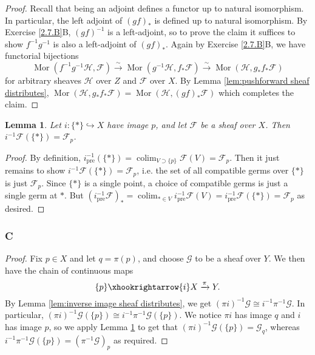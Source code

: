 \documentclass{article}
\newcommand{\fF}{\mathscr{F}}
\newcommand{\fG}{\mathscr{G}}
\newcommand{\fH}{\mathscr{H}}
\DeclareMathOperator{\pre}{\mathrm{pre}}
\DeclareMathOperator{\colim}{\mathrm{colim}}
\DeclareMathOperator{\Mor}{\mathrm{Mor}}
\newtheorem{lemma}[theorem]{Lemma}
\begin{document}
    \begin{proof}
        Recall that being an adjoint defines a functor up to natural isomorphism. In particular, the left adjoint of $(gf)_*$ is defined up to natural isomorphism. By Exercise \ref{2.7.B}B, $(gf)^{-1}$ is a left-adjoint, so to prove the claim it suffices to show $f^{-1}g^{-1}$ is also a left-adjoint of $(gf)_*$. Again by Exercise \ref{2.7.B}B, we have functorial bijections
        \[
        \Mor(f^{-1}g^{-1}\fH, \fF) \xrightarrow{\sim} \Mor(g^{-1} \fH, f_* \fF) \xrightarrow{\sim } \Mor(\fH, g_* f_* \fF)
        \]
        for arbitrary sheaves $\fH$ over $Z$ and $\fF$ over $X$. By Lemma \ref{lem:pushforward sheaf distributes}, $\Mor(\fH,g_*f_*\fF)= \Mor(\fH, (gf)_* \fF)$ which completes the claim.
    \end{proof}
    \begin{lemma}\label{lem:stalk as inverse image sheaf}
        Let $i:\{*\}\hookrightarrow X$ have image $p$, and let $\fF$ be a sheaf over $X$. Then $i^{-1} \fF(\{*\})=\fF_p$.
    \end{lemma}
    \begin{proof}
        By definition, $i^{-1}_{\pre}(\{*\})=\colim_{V\supset \{p\}} \fF(V) = \fF_p$. Then it just remains to show $i^{-1} \fF(\{*\}) = \fF_p$, i.e. the set of all compatible germs over $\{*\}$ is just $\fF_p$. Since $\{*\}$ is a single point, a choice of compatible germs is just a single germ at $*$. But $(i^{-1}_{\pre} \fF)_*=\colim_{*\in V} i^{-1}_{\pre} \fF(V)= i^{-1}_{\pre} \fF(\{*\})= \fF_p$ as desired. 
    \end{proof}
\subsubsection{C}\label{2.7.C}
\begin{proof}
    Fix $p\in X$ and let $q=\pi(p)$, and choose $\fG$ to be a sheaf over $Y$. We then have the chain of continuous maps $$\{p\} \xhookrightarrow{i}X \xrightarrow{\pi}Y.$$ By Lemma \ref{lem:inverse image sheaf distributes}, we get $(\pi  i)^{-1} \fG \cong i^{-1} \pi^{-1} \fG$. In particular, $(\pi i)^{-1} \fG(\{p\}) \cong i^{-1} \pi^{-1} \fG(\{p\})$. We notice $\pi i$ has image $q$ and $i$ has image $p$, so we apply Lemma \ref{lem:stalk as inverse image sheaf} to get that $(\pi i)^{-1} \fG(\{p\})=\fG_q$, whereas $i^{-1} \pi^{-1} \fG(\{p\}) = (\pi^{-1} \fG)_p$ as required.
\end{proof}
\end{document}

